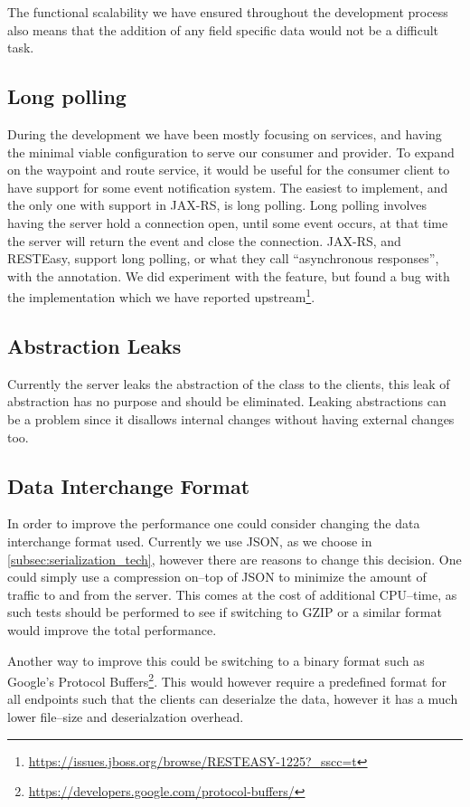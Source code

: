 The functional scalability we have ensured throughout the development process also means that the addition of any field specific data would not be a difficult task.

\subsection{Long polling}
During the development we have been mostly focusing on services, and having the
minimal viable configuration to serve our consumer and provider. To expand on
the waypoint and route service, it would be useful for the consumer client to
have support for some event notification system. The easiest to implement, and
the only one with support in JAX-RS, is long polling. Long polling involves
having the server hold a connection open, until some event occurs, at that time
the server will return the event and close the connection. JAX-RS, and RESTEasy,
support long polling, or what they call ``asynchronous responses'', with the
 annotation. We did experiment with the feature, but found
a bug with the implementation which we have reported
upstream\footnote{\url{https://issues.jboss.org/browse/RESTEASY-1225?_sscc=t}}.

\subsection{Abstraction Leaks}
Currently the server leaks the abstraction of the  class to the clients, 
this leak of abstraction has no purpose and should be eliminated.
Leaking abstractions can be a problem since it disallows internal changes without having external changes too. 

\subsection{Data Interchange Format}
In order to improve the performance one could consider changing the data interchange format used. 
Currently we use JSON, as we choose in \cref{subsec:serialization_tech}, however there are reasons to change this decision.
One could simply use a compression on--top of JSON to minimize the amount of traffic to and from the server.
This comes at the cost of additional CPU--time, as such tests should be performed to see if switching to GZIP or a similar format would improve the total performance.

Another way to improve this could be switching to a binary format such as Google's Protocol Buffers\footnote{\url{https://developers.google.com/protocol-buffers/}}.
This would however require a predefined format for all endpoints such that the clients can deserialze the data, however it has a much lower file--size and deserialzation overhead. 
